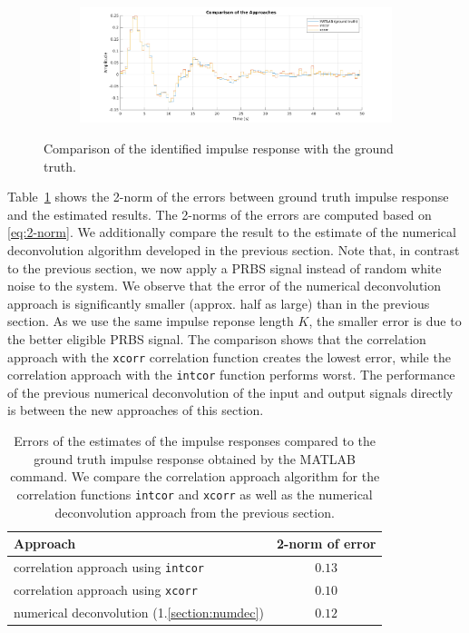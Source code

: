 \documentclass{scrartcl}
\begin{document}
\begin{figure}[h!]
\begin{subfigure}{\textwidth}
		\includegraphics[width=\textwidth]{figures/impulse_response_comparison.pdf}
		\label{fig:impulse_response_comparison}
	\end{subfigure}
	\caption{Comparison of the identified impulse response with the ground truth.}\label{fig:correlation_impulse_responses}
\end{figure}

Table~\ref{tab:correlation_appraoch_errors} shows the 2-norm of the errors between ground truth impulse response and the estimated results.
The 2-norms of the errors are computed based on \eqref{eq:2-norm}.
We additionally compare the result to the estimate of the numerical deconvolution algorithm developed in the previous section.
Note that, in contrast to the previous section, we now apply a PRBS signal instead of random white noise to the system.
We observe that the error of the numerical deconvolution approach is significantly smaller (approx. half as large) than in the previous section. 
As we use the same impulse reponse length $K$, the smaller error is due to the better eligible PRBS signal.
The comparison shows that the correlation approach with the \texttt{xcorr} correlation function creates the lowest error, while the correlation approach with the \texttt{intcor} function performs worst.
The performance of the previous numerical deconvolution of the input and output signals directly is between the new approaches of this section.
\begin{table}[h]
	\centering
	\begin{tabular}{l|c}
	\hline
	\hline
	\textbf{Approach} & \textbf{2-norm of error}\\
	\hline
		correlation approach using \texttt{intcor} & $0.13$ \\
		correlation approach using \texttt{xcorr} & $0.10$ \\\hline
		numerical deconvolution (1.\ref{section:numdec}) & $0.12$\\
	\hline
	\hline
	\end{tabular}
	\caption{Errors of the estimates of the impulse responses compared to the ground truth impulse response obtained by the MATLAB command. We compare the correlation approach algorithm for the correlation functions \texttt{intcor} and \texttt{xcorr} as well as the numerical deconvolution approach from the previous section.}
	\label{tab:correlation_appraoch_errors}
\end{table}
\end{document}
